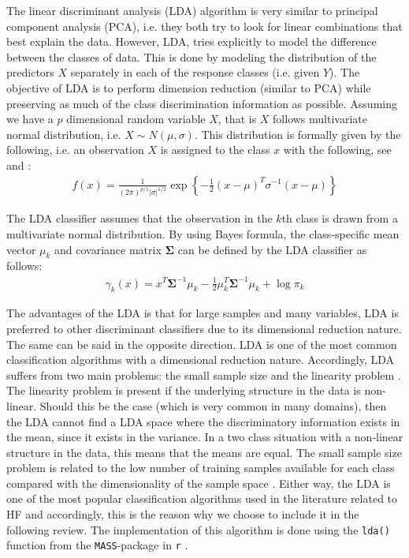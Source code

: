 \documentclass[../thesis.tex]{subfiles}
\begin{document}
\noindent The linear discriminant analysis (LDA) algorithm is very similar to principal component analysis (PCA), i.e. they both try to look for linear combinations that best explain the data. However, LDA, tries explicitly to model the difference between the classes of data. This is done by modeling the distribution of the predictors $X$ separately in each of the response classes (i.e. given $Y$). The objective of LDA is to perform dimension reduction (similar to PCA) while preserving as much of the class discrimination information as possible. Assuming we have a $p$ dimensional random variable $X$, that is $X$ follows multivariate normal distribution, i.e. $X \sim N(\mu,\sigma)$. This distribution is formally given by the following, i.e. an observation $X$ is assigned to the class $x$ with the following, see \cite{friedman2009elements} and \cite{james2013introduction}:
\begin{align}
    f(x) = \frac{1}{(2\pi)^{p / 1}|\sigma|^{1/2}} \exp\left \{-\frac{1}{2}(x-\mu)^T \sigma^{-1} (x - \mu) \right \}
\end{align}

\noindent The LDA classifier assumes that the observation in the $k$th class is drawn from a multivariate normal distribution. By using Bayes formula, the class-specific mean vector $\mu_k$ and covariance matrix $\boldsymbol{\Sigma}$ can be defined by the LDA classifier as follows:
\newpage
\begin{align}
    \gamma_k (x) = x^T\boldsymbol{\Sigma}^{-1} \mu_k - \frac{1}{2}\mu_k^T\boldsymbol{\Sigma}^{-1} \mu_k + \log \pi_k
\end{align}

\noindent The advantages of the LDA is that for large samples and many variables, LDA is preferred to other discriminant classifiers due to its dimensional reduction nature. The same can be said in the opposite direction. LDA is one of the most common classification algorithms with a dimensional reduction nature. Accordingly, LDA suffers from two main problems: the small sample size and the linearity problem \citep{tharwat2017linear}. The linearity problem is present if the underlying structure in the data is non-linear. Should this be the case (which is very common in many domains), then the LDA cannot find a LDA space where the discriminatory information exists in the mean, since it exists in the variance. In a two class situation with a non-linear structure in the data, this means that the means are equal. The small sample size problem is related to the low number of training samples available for each class compared with the dimensionality of the sample space \citep{tharwat2017linear}. Either way, the LDA is one of the most popular classification algorithms used in the literature related to HF and accordingly, this is the reason why we choose to include it in the following review. The implementation of this algorithm is done using the \texttt{lda()} function from the \texttt{MASS}-package in \texttt{r} \citep{MASS}.
\end{document}
